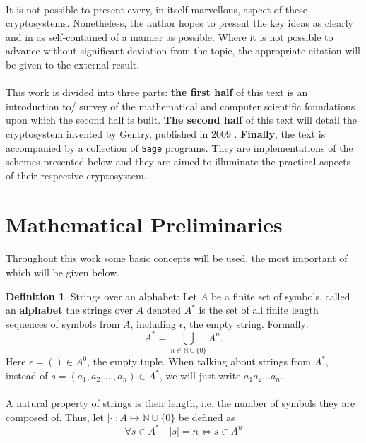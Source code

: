 \documentclass{article}
\theoremstyle{definition}
\newtheorem{definition}{Definition}[section]
\newcommand{\Nat}{\mathbb{N}}
\begin{document}
\paragraph{}
It is not possible to present every, in itself marvellous, aspect of these
cryptosystems. Nonetheless, the author hopes to present the key ideas as
clearly and in as self-contained of a manner as possible. Where it is not
possible to advance without significant deviation from the topic, the
appropriate citation will be given to the external result.
\paragraph{}
This work is divided into three parts: \textbf{the first half} of this text is an
introduction to/ survey of the mathematical and computer scientific foundations
upon which the second half is built. \textbf{The second half} of this text will
detail the cryptosystem invented by Gentry, published in 2009
\cite{gentry2009fully}. \textbf{Finally}, the text is accompanied by a
collection of \texttt{Sage} \cite{SageMath} programs. They are implementations
of the schemes presented below and they are aimed to illuminate the practical
aspects of their respective cryptosystem.

\section{Mathematical Preliminaries}
\paragraph{}
Throughout this work some basic concepts will be used, the most important of
which will be given below.
\begin{definition}{Strings over an alphabet:}
  Let $A$ be a finite set of symbols, called an \textbf{alphabet} the strings
  over $A$ denoted $A^*$ is the set of all finite length sequences of
  symbols from $A$, including $\epsilon$, the empty string. Formally:
  \[
    A^* = \bigcup_{n\in \Nat \cup \{0\}} A^n.
  \]
  Here $\epsilon = () \in A^0$, the empty tuple. When talking about strings from $A^*$, instead of $s = (a_1, a_2, \hdots, a_n)
  \in A^*$, we will just write $a_1a_2\hdots a_n$.
\end{definition}
\paragraph{}
A natural property of strings is their length, i.e. the number of symbols they
are composed of. Thus, let $|\cdot| : A
\mapsto \Nat \cup \{0\}$ be defined as
\[
  \forall s \in A^* \quad |s| = n \Leftrightarrow s \in A^n
\]
\end{document}

